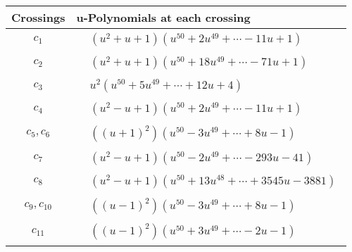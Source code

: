 \documentclass[1p]{elsarticle_modified}
\theoremstyle{definition}
\begin{document}
\begin{tabular}{m{50pt}|m{274pt}}
Crossings & \hspace{64pt}u-Polynomials at each crossing \\
\hline $$\begin{aligned}c_{1}\end{aligned}$$&$\begin{aligned}
&(u^2+u+1)(u^{50}+2 u^{49}+\cdots-11 u+1)
\end{aligned}$\\
\hline $$\begin{aligned}c_{2}\end{aligned}$$&$\begin{aligned}
&(u^2+u+1)(u^{50}+18 u^{49}+\cdots-71 u+1)
\end{aligned}$\\
\hline $$\begin{aligned}c_{3}\end{aligned}$$&$\begin{aligned}
&u^2(u^{50}+5 u^{49}+\cdots+12 u+4)
\end{aligned}$\\
\hline $$\begin{aligned}c_{4}\end{aligned}$$&$\begin{aligned}
&(u^2- u+1)(u^{50}+2 u^{49}+\cdots-11 u+1)
\end{aligned}$\\
\hline $$\begin{aligned}c_{5},c_{6}\end{aligned}$$&$\begin{aligned}
&((u+1)^2)(u^{50}-3 u^{49}+\cdots+8 u-1)
\end{aligned}$\\
\hline $$\begin{aligned}c_{7}\end{aligned}$$&$\begin{aligned}
&(u^2- u+1)(u^{50}-2 u^{49}+\cdots-293 u-41)
\end{aligned}$\\
\hline $$\begin{aligned}c_{8}\end{aligned}$$&$\begin{aligned}
&(u^2- u+1)(u^{50}+13 u^{48}+\cdots+3545 u-3881)
\end{aligned}$\\
\hline $$\begin{aligned}c_{9},c_{10}\end{aligned}$$&$\begin{aligned}
&((u-1)^2)(u^{50}-3 u^{49}+\cdots+8 u-1)
\end{aligned}$\\
\hline $$\begin{aligned}c_{11}\end{aligned}$$&$\begin{aligned}
&((u-1)^2)(u^{50}+3 u^{49}+\cdots-2 u-1)
\end{aligned}$\\
\hline
\end{tabular}\newpage\renewcommand{\arraystretch}{1}
\end{document}
